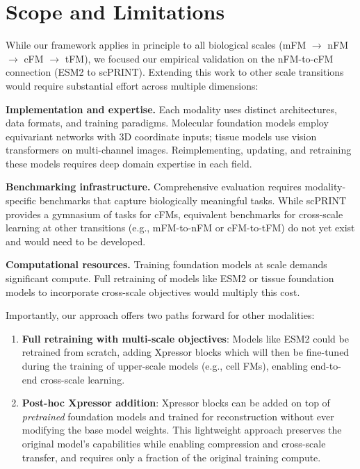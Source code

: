 \section*{Scope and Limitations}

While our framework applies in principle to all biological scales (\gls{mFM} $\rightarrow$ \gls{nFM} $\rightarrow$ \gls{cFM} $\rightarrow$ \gls{tFM}), we focused our empirical validation on the nFM-to-cFM connection (ESM2 to \gls{scPRINT}). Extending this work to other scale transitions would require substantial effort across multiple dimensions:

\textbf{Implementation and expertise.} Each modality uses distinct architectures, data formats, and training paradigms. Molecular foundation models employ equivariant networks with 3D coordinate inputs; tissue models use vision transformers on multi-channel images. Reimplementing, updating, and retraining these models requires deep domain expertise in each field.

\textbf{Benchmarking infrastructure.} Comprehensive evaluation requires modality-specific benchmarks that capture biologically meaningful tasks. While scPRINT provides a gymnasium of tasks for cFMs, equivalent benchmarks for cross-scale learning at other transitions (e.g., \gls{mFM}-to-\gls{nFM} or \gls{cFM}-to-\gls{tFM}) do not yet exist and would need to be developed.

\textbf{Computational resources.} Training foundation models at scale demands significant compute. Full retraining of models like \gls{ESM}2 or tissue foundation models to incorporate cross-scale objectives would multiply this cost.

Importantly, our approach offers two paths forward for other modalities:

\begin{enumerate}
   \item \textbf{Full retraining with multi-scale objectives}: Models like \gls{ESM}2 could be retrained from scratch, adding Xpressor blocks which will then be fine-tuned during the training of upper-scale models (e.g., cell FMs), enabling end-to-end cross-scale learning.
   \item \textbf{Post-hoc Xpressor addition}: Xpressor blocks can be added on top of \emph{pretrained} foundation models and trained for reconstruction without ever modifying the base model weights. This lightweight approach preserves the original model's capabilities while enabling compression and cross-scale transfer, and requires only a fraction of the original training compute.
\end{enumerate}

